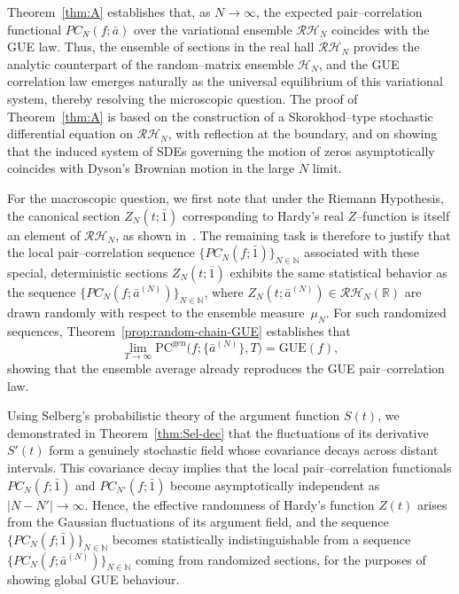\documentclass[12pt,reqno]{amsart}
\theoremstyle{plain}
\theoremstyle{definition}
\theoremstyle{remark}
\begin{document}
Theorem~\ref{thm:A} establishes that, as $N\to\infty$, 
the expected pair--correlation functional 
$PC_N(f;\bar a)$ over the variational ensemble $\mathcal{RH}_N$ 
coincides with the GUE law.  
Thus, the ensemble of sections in the real hall $\mathcal{RH}_N$ 
provides the analytic counterpart of the random--matrix ensemble $\mathcal{H}_N$, 
and the GUE correlation law emerges naturally as the universal equilibrium 
of this variational system, thereby resolving the microscopic question. The proof of Theorem~\ref{thm:A} is based on the construction of a 
Skorokhod--type stochastic differential equation on $\mathcal{RH}_N$, 
with reflection at the boundary, 
and on showing that the induced system of SDEs governing the motion of zeros 
asymptotically coincides with Dyson’s Brownian motion in the large $N$ limit.

For the macroscopic question, we first note that under the Riemann Hypothesis, 
the canonical section $Z_N(t;\bar 1)$ corresponding to Hardy’s real $Z$--function 
is itself an element of $\mathcal{RH}_N$, as shown in~\cite{J4}.  
The remaining task is therefore to justify that the local pair--correlation sequence 
$\{PC_N(f;\bar 1)\}_{N\in\mathbb{N}}$ associated with these special, deterministic sections 
$Z_N(t;\bar 1)$ exhibits the same statistical behavior as the sequence 
$\{PC_N(f;\bar a^{(N)})\}_{N\in\mathbb{N}}$, 
where $Z_N(t;\bar a^{(N)}) \in \mathcal{RH}_N(\mathbb{R})$ 
are drawn randomly with respect to the ensemble measure~$\mu_N$.  
For such randomized sequences, Theorem~\ref{prop:random-chain-GUE} establishes that  
\begin{equation}
\lim_{T\to\infty}
\mathrm{PC}^{\mathrm{gen}}\!\bigl(f;\{\bar a^{(N)}\},T\bigr)
=\mathrm{GUE}(f),
\end{equation}
showing that the ensemble average already reproduces the GUE pair--correlation law.

Using Selberg’s probabilistic theory of the argument function $S(t)$, 
we demonstrated in Theorem~\ref{thm:Sel-dec} that the fluctuations of its derivative $S'(t)$ 
form a genuinely stochastic field whose covariance decays across distant intervals.  
This covariance decay implies that the local pair--correlation functionals  
$PC_N(f;\bar1)$ and $PC_{N'}(f;\bar1)$ become asymptotically independent as $|N-N'|\to\infty$.  
Hence, the effective randomness of Hardy’s function $Z(t)$ arises from the Gaussian 
fluctuations of its argument field, and the sequence 
$\{PC_N(f;\bar1)\}_{N\in\mathbb{N}}$ becomes statistically indistinguishable 
from a sequence 
$\{PC_N(f;\bar a^{(N)})\}_{N\in\mathbb{N}}$ coming from randomized sections, for the purposes of showing global GUE behaviour.
\end{document}
